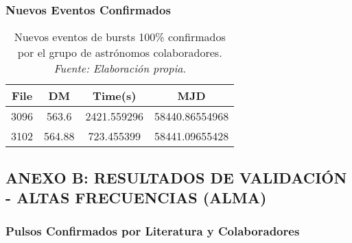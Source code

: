 \subsubsection{Nuevos Eventos Confirmados}

\begin{table}[H]
    \centering
    \caption{Nuevos eventos de bursts 100\% confirmados por el grupo de astrónomos colaboradores. \textit{Fuente: Elaboración propia}.}
    \label{tab:anexo_new_confirmed_bursts}
    \begin{tabular}{|c|c|c|c|}
        \hline
        \textbf{File} & \textbf{DM} & \textbf{Time(s)} & \textbf{MJD} \\
        \hline
        3096 & 563.6 & 2421.559296 & 58440.86554968 \\
        3102 & 564.88 & 723.455399 & 58441.09655428 \\
        \hline
    \end{tabular}
\end{table}

\subsection{ANEXO B: RESULTADOS DE VALIDACIÓN - ALTAS FRECUENCIAS (ALMA)}

\subsubsection{Pulsos Confirmados por Literatura y Colaboradores}


